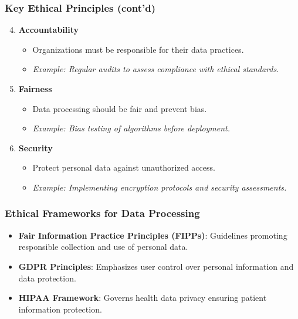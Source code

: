 \documentclass[aspectratio=169]{beamer}
\begin{document}
\begin{frame}[fragile]
    \frametitle{Key Ethical Principles (cont'd)}
    \begin{enumerate}
        \setcounter{enumi}{3} %
        \item \textbf{Accountability}
        \begin{itemize}
            \item Organizations must be responsible for their data practices.
            \item \textit{Example: Regular audits to assess compliance with ethical standards.}
        \end{itemize}
        
        \item \textbf{Fairness}
        \begin{itemize}
            \item Data processing should be fair and prevent bias.
            \item \textit{Example: Bias testing of algorithms before deployment.}
        \end{itemize}
        
        \item \textbf{Security}
        \begin{itemize}
            \item Protect personal data against unauthorized access.
            \item \textit{Example: Implementing encryption protocols and security assessments.}
        \end{itemize}
    \end{enumerate}
\end{frame}

\begin{frame}[fragile]
    \frametitle{Ethical Frameworks for Data Processing}
    \begin{itemize}
        \item \textbf{Fair Information Practice Principles (FIPPs)}: Guidelines promoting responsible collection and use of personal data.
        \item \textbf{GDPR Principles}: Emphasizes user control over personal information and data protection.
        \item \textbf{HIPAA Framework}: Governs health data privacy ensuring patient information protection.
    \end{itemize}
\end{frame}
\end{document}
